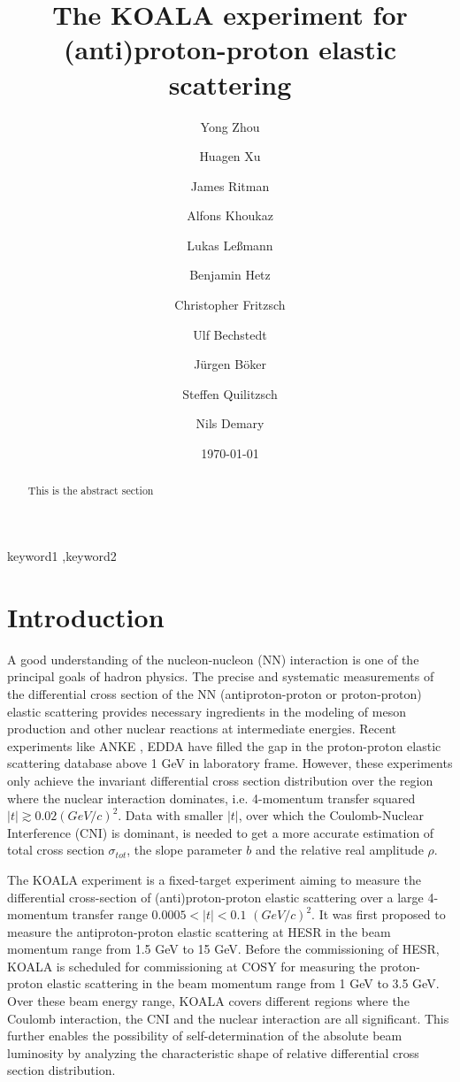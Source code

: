 \documentclass[number]{elsarticle}
\title{The KOALA experiment for (anti)proton-proton elastic scattering}
\date{\today}
\author[ikp]{Yong Zhou\corref{cor}}
\author[ikp]{Huagen Xu}
\author[ikp,bochum]{James Ritman}
\author[muenster]{Alfons Khoukaz}
\author[muenster]{Lukas Leßmann}
\author[muenster]{Benjamin Hetz}
\author[muenster]{Christopher Fritzsch}
\author[ikp]{Ulf Bechstedt}
\author[ikp]{Jürgen Böker}
\author[ikp]{Steffen Quilitzsch}
\author[ikp]{Nils Demary}
\begin{document}
	
\begin{abstract}
	This is the abstract section
\end{abstract}

\begin{keyword}
	keyword1 \sep keyword2
\end{keyword}


\maketitle
\tableofcontents
\newpage

\section{Introduction}
\label{sec:introduction}

A good understanding of the nucleon-nucleon (NN) interaction is one of the principal goals of hadron physics.
The precise and systematic measurements of the differential cross section of the NN (antiproton-proton or proton-proton) elastic scattering provides necessary ingredients
in the modeling of meson production and other nuclear reactions at intermediate energies.
Recent experiments like ANKE \cite{ANKE}, EDDA \cite{EDDA} have filled the gap in the proton-proton elastic scattering database above 1 GeV in laboratory frame.
However, these experiments only achieve the invariant differential cross section distribution over the region where the nuclear interaction dominates, 
i.e. 4-momentum transfer squared \(|t| \gtrsim 0.02 (GeV/c)^2\).
Data with smaller \(|t|\), over which the Coulomb-Nuclear Interference (CNI) is dominant, is needed to get a more accurate estimation of total cross section \({\sigma}_{tot}\), the slope parameter \(b\) and the relative real amplitude \(\rho\).

The KOALA experiment is a fixed-target experiment aiming to measure the differential cross-section of (anti)proton-proton elastic scattering 
over a large 4-momentum transfer range \(0.0005 < |t| < 0.1\) \((GeV/c)^2\).
It was first proposed to measure the antiproton-proton elastic scattering at HESR in the beam momentum range from 1.5 GeV to 15 GeV.
Before the commissioning of HESR, KOALA is scheduled for commissioning at COSY for measuring the proton-proton elastic scattering in the beam momentum range from 1 GeV to 3.5 GeV.
Over these beam energy range, KOALA covers different regions where the Coulomb interaction, the CNI and the nuclear interaction are all significant.
This further enables the possibility of self-determination of the absolute beam luminosity by analyzing the characteristic shape of relative differential cross section distribution.
\end{document}
